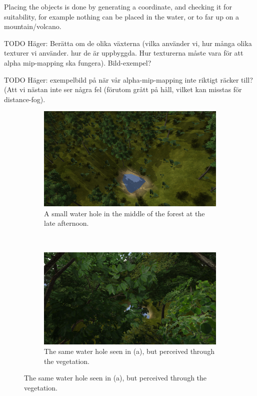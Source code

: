 Placing the objects is done by generating a coordinate, and checking it for suitability, for example nothing can be placed in the water, or to far up on a mountain/volcano.

TODO Häger: Berätta om de olika växterna (vilka använder vi, hur många olika texturer vi använder. hur de är uppbyggda. Hur texturerna måste vara för att alpha mip-mapping ska fungera). Bild-exempel?

TODO Häger: exempelbild på när vår alpha-mip-mapping inte riktigt räcker till?  (Att vi nästan inte ser några fel (förutom grått på håll, vilket kan misstas för distance-fog).

\newpage
\begin{figure}[H]
\begin{subfigure}{0.9\textwidth}
  \centering
  \includegraphics[width=0.9\linewidth]{images/content1.jpg}
  \caption{A small water hole in the middle of the forest at the late afternoon.}
  \label{fig:vegetation0}
\end{subfigure}%
\\
\begin{subfigure}{0.9\textwidth}
  \centering
  \includegraphics[width=0.9\linewidth]{images/vegetation1.jpg}
  \caption{The same water hole seen in (a), but perceived through the vegetation.}
  \label{fig:vegetation1}

\end{subfigure}
\end{figure}
